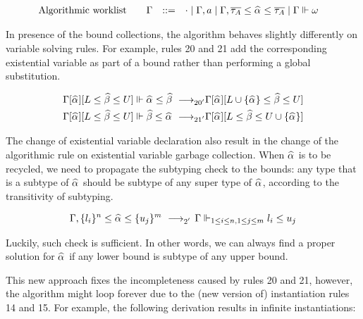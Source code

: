 \begin{gather*}
    \begin{aligned}
        \text{Algorithmic worklist}\qquad&\Gm &::=&\quad \cdot \mid \Gm, a \mid \Gm, \overline{\tau_A} \le \al \le \overline{\tau_A} \mid \Gm \Vdash \jg
    \end{aligned}
\end{gather*}

In presence of the bound collections, the algorithm behaves slightly differently
on variable solving rules.
For example, rules 20 and 21 add the corresponding existential variable
as part of a bound rather than performing a global substitution.

\begin{gather*}
    \begin{aligned}
\Gm[\al][L \le \bt \le U] \Vdash \al \le \bt &\rrule{20'}
    \Gm[\al][L \cup \{\al\} \le \bt \le U]\\
\Gm[\al][L \le \bt \le U] \Vdash \bt \le \al &\rrule{21'}
    \Gm[\al][L \le \bt \le U \cup \{\al\}]\\
    \end{aligned}
\end{gather*}

The change of existential variable declaration also result in the change of
the algorithmic rule on existential variable garbage collection.
When $\al$ is to be recycled, we need to propagate the subtyping check to
the bounds: any type that is a subtype of $\al$ should be subtype of
any super type of $\al$, according to the transitivity of subtyping.

\begin{gather*}
    \begin{aligned}
\Gm, \{l_i\}^n \le \al \le \{u_j\}^m &\rrule{2'}
    \Gm \Vdash_{1 \le i \le n, 1 \le j \le m} l_i \le u_j\\
    \end{aligned}
\end{gather*}

Luckily, such check is sufficient. In other words,
we can always find a proper solution for $\al$ if any lower bound
is subtype of any upper bound.

This new approach fixes the incompleteness caused by rules 20 and 21,
however, the algorithm might loop forever due to the
(new version of) instantiation rules 14 and 15.
For example, the following derivation results in infinite instantiations:

